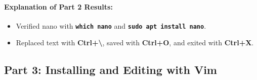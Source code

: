 \documentclass[10pt,a4paper]{article}
\newcommand{\cmd}[1]{\texttt{\textbf{#1}}}
\newcommand{\key}[1]{\textbf{\textcolor{termkey}{#1}}}
\begin{document}
\paragraph{Explanation of Part 2 Results:}
\begin{itemize}[noitemsep,topsep=1pt,leftmargin=1.2em]
  \item Verified nano with \cmd{which nano} and \cmd{sudo apt install nano}.
  \item Replaced text with \key{Ctrl+\textbackslash}, saved with \key{Ctrl+O}, and exited with \key{Ctrl+X}.
\end{itemize}

\newpage

\subsection{Part 3: Installing and Editing with Vim}
\end{document}
